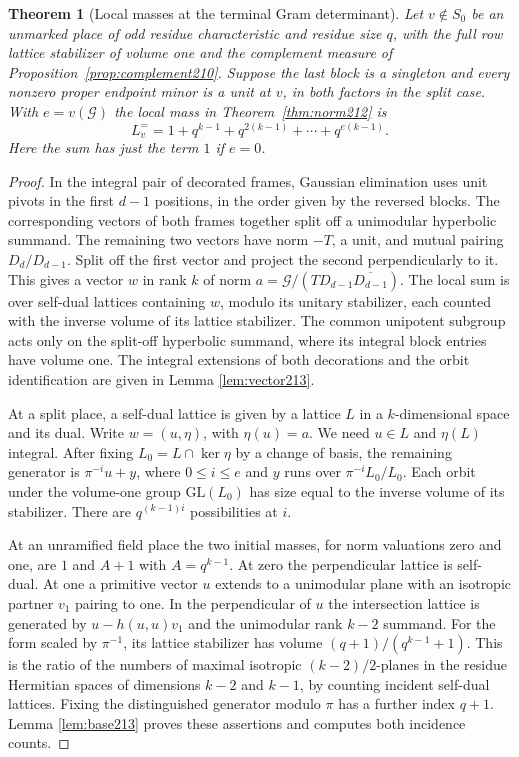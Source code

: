 \documentclass[a4paper,11pt]{article}
\newtheorem{theorem}[proposition]{Theorem}
\theoremstyle{definition}
\theoremstyle{remark}
\numberwithin{equation}{section}
\begin{document}
\begin{theorem}[Local masses at the terminal Gram determinant]
\label{thm:local214}
Let \(v\notin S_0\) be an unmarked place of odd residue
characteristic and residue size \(q\), with the full row lattice
stabilizer of volume one and the complement measure of
Proposition~\ref{prop:complement210}. Suppose the last block is
a singleton and every nonzero proper endpoint minor is a unit
at \(v\), in both factors in the split case. With \(e=v(\mathcal G)\)
the local mass in Theorem~\ref{thm:norm212} is
\[
             L_v^{=}=1+q^{k-1}+q^{2(k-1)}+\cdots+q^{e(k-1)}.
\]
Here the sum has just the term \(1\) if \(e=0\).
\end{theorem}
\begin{proof}
In the integral pair of decorated frames, Gaussian elimination
uses unit pivots in the first \(d-1\) positions, in the order
given by the reversed blocks. The corresponding vectors of
both frames together split off a unimodular hyperbolic summand.
The remaining two vectors have norm \(-T\), a unit, and mutual
pairing \(D_d/D_{d-1}\). Split off the first vector and project
the second perpendicularly to it. This gives a vector \(w\) in
rank \(k\) of norm \(a=\mathcal G/(T D_{d-1}\overline{D_{d-1}})\).
The local sum is over self-dual lattices containing \(w\), modulo
its unitary stabilizer, each counted with the inverse volume of
its lattice stabilizer. The common unipotent subgroup acts only
on the split-off hyperbolic summand, where its integral block
entries have volume one. The integral extensions of both
decorations and the orbit identification are given in
Lemma \ref{lem:vector213}.

At a split place, a self-dual lattice is given by a lattice \(L\)
in a \(k\)-dimensional space and its dual. Write \(w=(u,\eta)\),
with \(\eta(u)=a\). We need \(u\in L\) and \(\eta(L)\) integral.
After fixing \(L_0=L\cap\ker\eta\) by a change of basis, the
remaining generator is \(\pi^{-i}u+y\), where \(0\le i\le e\)
and \(y\) runs over \(\pi^{-i}L_0/L_0\). Each orbit under the
volume-one group \(\mathrm{GL}(L_0)\) has size equal to the
inverse volume of its stabilizer. There are \(q^{(k-1)i}\)
possibilities at \(i\).

At an unramified field place the two initial masses, for norm
valuations zero and one, are \(1\) and \(A+1\) with \(A=q^{k-1}\).
At zero the perpendicular lattice is self-dual. At one a primitive
vector \(u\) extends to a unimodular plane with an isotropic
partner \(v_1\) pairing to one. In the perpendicular of \(u\)
the intersection lattice is generated by \(u-h(u,u)v_1\) and
the unimodular rank \(k-2\) summand. For the form scaled by
\(\pi^{-1}\), its lattice stabilizer has volume
\((q+1)/(q^{k-1}+1)\). This is the ratio of the numbers of
maximal isotropic \((k-2)/2\)-planes in the residue Hermitian
spaces of dimensions \(k-2\) and \(k-1\), by counting incident
self-dual lattices. Fixing the distinguished generator modulo
\(\pi\) has a further index \(q+1\).
Lemma \ref{lem:base213}
proves these assertions and computes both incidence counts.


\end{proof}
\end{document}
